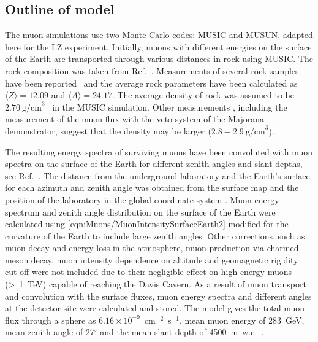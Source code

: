 \subsection{Outline of model}\label{sec:Muons/ModelOutline}
The muon simulations use two Monte-Carlo codes: MUSIC and MUSUN, adapted here for the LZ experiment. Initially, muons with different energies on the surface of the Earth are transported through various distances in rock using MUSIC. The rock composition was taken from Ref.~\cite{mei,zhang}. Measurements of several rock samples have been reported~\cite{mei,zhang} and the average rock parameters have been calculated as $\langle Z\rangle=12.09$ and $\langle A\rangle=24.17$. The average density of rock was assumed to be $2.70~\text{g/cm}^3$~\cite{zhang} in the MUSIC simulation. Other measurements \cite{Heise:2021eym}, including the measurement of the muon flux with the veto system of the Majorana demonstrator, suggest that the density may be larger ($2.8-2.9~\text{g/cm}^3$\cite{majorana}).

The resulting energy spectra of surviving muons have been convoluted with muon spectra on the surface of the Earth for different zenith angles and slant depths, see Ref.~\cite{musun}. The distance from the underground laboratory and the Earth's surface for each azimuth and zenith angle was obtained from the surface map and the position of the laboratory in the global coordinate system \cite{richardson}.
Muon energy spectrum and zenith angle distribution on the surface of the Earth were calculated using \autoref{eqn:Muons/MuonIntensitySurfaceEarth2} modified for the curvature of the Earth to include large zenith angles. Other corrections, such as muon decay and energy loss in the atmosphere, muon production via charmed meson decay, muon intensity dependence on altitude and geomagnetic rigidity cut-off were not included due to their negligible effect on high-energy muons (\textgreater~1~TeV) capable of reaching the Davis Cavern.
As a result of muon transport and convolution with the surface fluxes, muon energy spectra and different angles at the detector site were calculated and stored. The model gives the total muon flux through a sphere as $6.16\times10^{-9}$~cm$^{-2}$~s$^{-1}$, mean muon energy of 283~GeV, mean zenith angle of 27$^{\circ}$ and the mean slant depth of 4500~m~w.e.~\cite{musun-lz}.

